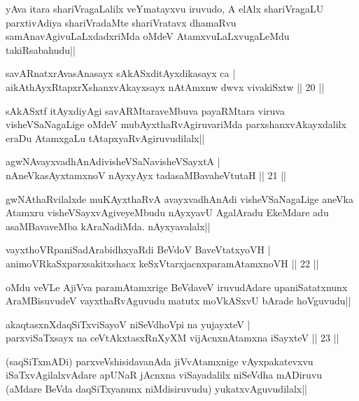 \begin{artha}
yAva itara shariVragaLalilx veYmatayxvu iruvudo, A elAlx shariVragaLU parxtivAdiya shariVradaMte shariVratavx dhamaRvu samAnavAgivuLaLxdadxriMda oMdeV AtamxvuLaLxvugaLeMdu takiRsabahudu||
\end{artha}

\begin{shl}
savARnatxrAvasAnasayx sAkASxditAyxdikasayx ca |\\
aikAthAyxRtapxrXshanxvAkayxsayx nA\s \s tAmxnw dwvx vivakiSxtw \hfill || 20 ||
\end{shl}

\begin{artha}
sAkASxtf itAyxdiyAgi savARMtaraveMbuva payaRMtara viruva visheVSaNagaLige oMdeV mubAyxthaRvAgiruvariMda parxshanxvAkayxdalilx eraDu AtamxgaLu tAtapxyaRvAgiruvudilalx||
\end{artha}

\begin{shl}
agwNAvayxvadhAnAdivisheVSaNavisheVSayxtA |\\
nAneVkasAyx\s \s tamxnoV nAyxyAyx tadasaMBavaheVtutaH \hfill || 21 ||
\end{shl}

\begin{artha}%
gwNAthaRvilalxde muKAyxthaRvA avayxvadhAnAdi visheVSaNagaLige aneVka Atamxru visheVSayxvAgiveyeMbudu nAyxyavU AgalAradu EkeMdare adu asaMBavaveMba kAraNadiMda. nAyxyavalalx||
\end{artha}

\begin{shl}
vayxthoVRpaniSadArabidhxyaRdi BeVdoV BaveVtatxyoVH |\\
animoVRkaSxparxsakitxshacx keSxVtarxjacnxparamAtamxnoVH \hfill || 22 ||
\end{shl}

\begin{artha}
oMdu veVLe AjiVva paramAtamxrige BeVdaveV iruvudAdare upaniSatatxnunx AraMBisuvudeV vayxthaRvAguvudu matutx moVkASxvU bArade hoVguvudu||  
\end{artha}

\begin{shl}
akaqtasxnXdaqSiTxviSayoV niSeVdhoV\s pi na yujayxteV |\\
parxviSaTxsayx na ceVtAkxtasxRnXyXM vijAcnxnAtamxna iSayxteV \hfill || 23 ||
\end{shl}

\begin{artha}
(saqSiTxmADi) parxveVshisidavanAda jiVvAtamxnige vAyxpakatevxvu iSaTxvAgilalxvAdare apUNaR jAcnxna viSayadalilx niSeVdha mADiruvu (aMdare BeVda daqSiTxyanunx niMdisiruvudu) yukatxvAguvudilalx||
\end{artha}

